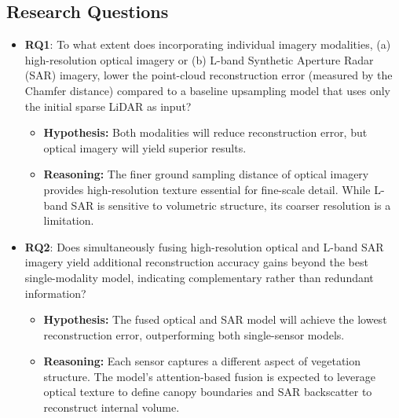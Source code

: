 \documentclass[remotesensing,article,submit,pdftex,moreauthors]{Definitions/mdpi}
\begin{document}
\subsection{Research Questions}
\begin{itemize}
  \item \textbf{RQ1}: To what extent does incorporating individual imagery modalities, (a) high-resolution optical imagery or (b) L-band Synthetic Aperture Radar (SAR) imagery, lower the point-cloud reconstruction error (measured by the Chamfer distance) compared to a baseline upsampling model that uses only the initial sparse LiDAR as input?
        \begin{itemize}
          \item \textbf{Hypothesis:} Both modalities will reduce reconstruction error, but optical imagery will yield superior results.
          \item \textbf{Reasoning:} The finer ground sampling distance of optical imagery provides high-resolution texture essential for fine-scale detail. While L-band SAR is sensitive to volumetric structure, its coarser resolution is a limitation.
        \end{itemize}

  \item \textbf{RQ2}: Does simultaneously fusing high-resolution optical and L-band SAR imagery yield additional reconstruction accuracy gains beyond the best single-modality model, indicating complementary rather than redundant information?
        \begin{itemize}
          \item \textbf{Hypothesis:} The fused optical and SAR model will achieve the lowest reconstruction error, outperforming both single-sensor models.
          \item \textbf{Reasoning:} Each sensor captures a different aspect of vegetation structure. The model's attention-based fusion is expected to leverage optical texture to define canopy boundaries and SAR backscatter to reconstruct internal volume.
        \end{itemize}


\end{itemize}
\end{document}
